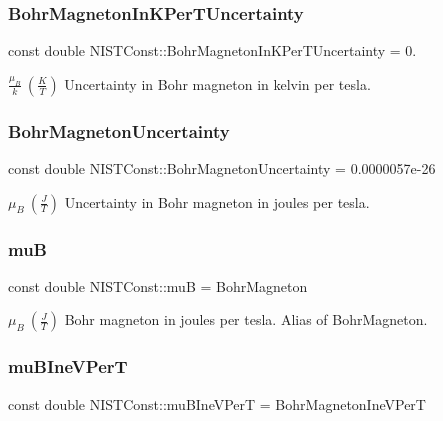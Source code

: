 \subsubsection{\texorpdfstring{Bohr\+Magneton\+In\+K\+Per\+T\+Uncertainty}{BohrMagnetonInKPerTUncertainty}}
{\footnotesize\ttfamily const double N\+I\+S\+T\+Const\+::\+Bohr\+Magneton\+In\+K\+Per\+T\+Uncertainty = 0.}

$\frac{\mu_B}{k} \ (\frac{K}{T})$ Uncertainty in Bohr magneton in kelvin per tesla. \mbox{\label{group___bohr_magneton_gaf2591aab0321fec9056cc1a8479cb05b}} 
\subsubsection{\texorpdfstring{Bohr\+Magneton\+Uncertainty}{BohrMagnetonUncertainty}}
{\footnotesize\ttfamily const double N\+I\+S\+T\+Const\+::\+Bohr\+Magneton\+Uncertainty = 0.\+0000057e-\/26}

$\mu_B \ (\frac{J}{T})$ Uncertainty in Bohr magneton in joules per tesla. \mbox{\label{group___bohr_magneton_gab42ee32e5e0323fc6268a5e14ac40b39}} 
\subsubsection{\texorpdfstring{muB}{muB}}
{\footnotesize\ttfamily const double N\+I\+S\+T\+Const\+::muB = Bohr\+Magneton}

$\mu_B \ (\frac{J}{T})$ Bohr magneton in joules per tesla. Alias of Bohr\+Magneton. \mbox{\label{group___bohr_magneton_gad2bd4164d07de53146b14398c6d4790d}} 
\subsubsection{\texorpdfstring{mu\+B\+Ine\+V\+PerT}{muBIneVPerT}}
{\footnotesize\ttfamily const double N\+I\+S\+T\+Const\+::mu\+B\+Ine\+V\+PerT = Bohr\+Magneton\+Ine\+V\+PerT}

